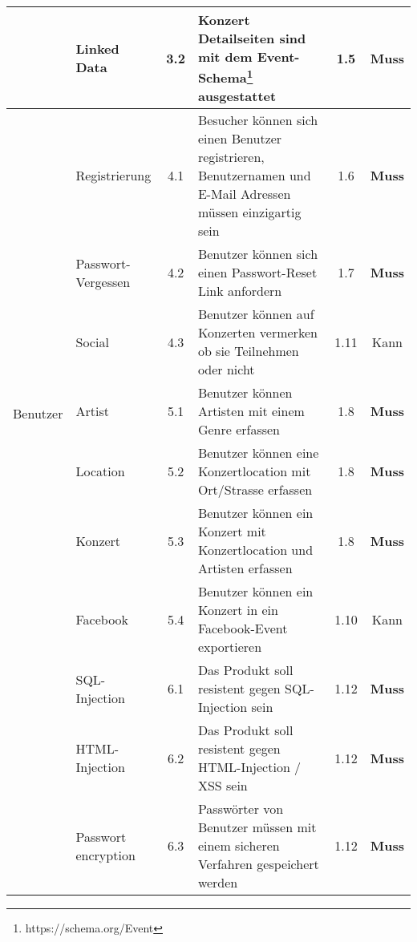 \begin{longtable}[]{@{}p{1.9cm}p{2.5cm}cp{5.5cm}cc@{}}
                             & Linked Data                & 3.2 & Konzert Detailseiten sind mit dem Event-Schema\footnote{https://schema.org/Event} ausgestattet              & 1.5  & \textbf{Muss}       \\
  \midrule
  \multirow{8}{*}{Benutzer}  & Registrierung              & 4.1 & Besucher können sich einen Benutzer registrieren, Benutzernamen und E-Mail Adressen müssen einzigartig sein & 1.6  & \textbf{Muss}       \\ \cline{2-6}
                             & Passwort-Vergessen         & 4.2 & Benutzer können sich einen Passwort-Reset Link anfordern                                                    & 1.7  & \textbf{Muss}       \\ \cline{2-6}
                             & Social                     & 4.3 & Benutzer können auf Konzerten vermerken ob sie Teilnehmen oder nicht                                        & 1.11 & Kann                \\
  \midrule
  \clearpage
  \multirow{6}{*}{Erfassung} & Artist                     & 5.1 & Benutzer können Artisten mit einem Genre erfassen                                                           & 1.8  & \textbf{Muss}       \\ \cline{2-6}
                             & Location                   & 5.2 & Benutzer können eine Konzertlocation mit Ort/Strasse erfassen                                               & 1.8  & \textbf{Muss}       \\ \cline{2-6}
                             & Konzert                    & 5.3 & Benutzer können ein Konzert mit Konzertlocation und Artisten erfassen                                       & 1.8  & \textbf{Muss}       \\ \cline{2-6}
                             & Facebook                   & 5.4 & Benutzer können ein Konzert in ein Facebook-Event exportieren                                               & 1.10 & Kann                \\
  \midrule
  \multirow{9}{*}{Security}  & SQL-Injection              & 6.1 & Das Produkt soll resistent gegen SQL-Injection sein                                                         & 1.12 & \textbf{Muss}       \\ \cline{2-6}
                             & HTML-Injection             & 6.2 & Das Produkt soll resistent gegen HTML-Injection / XSS sein                                                  & 1.12 & \textbf{Muss}       \\ \cline{2-6}
                             & Passwort encryption        & 6.3 & Passwörter von Benutzer müssen mit einem sicheren Verfahren gespeichert werden                              & 1.12 & \textbf{Muss}       \\

\end{longtable}
